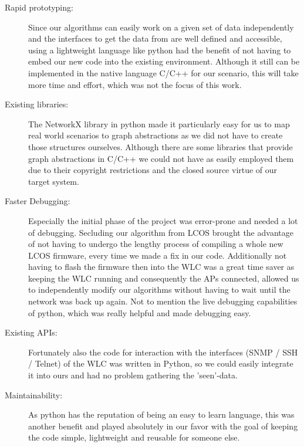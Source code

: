     \begin{description}
      \item [Rapid prototyping:]
	Since our algorithms can easily work on a given set of data independently and the interfaces to get the data from are well defined and accessible,
	using a lightweight language like python had the benefit of not having to embed our new code into the existing environment. 
	Although it still can be implemented in the native language C/C++ for our scenario, this will take more time and effort, which was not the focus of this work.
      \item[Existing libraries:]
	The NetworkX library in python made it particularly easy for us to map real world scenarios to graph abstractions as we did not have to create those structures ourselves.
	Although there are some libraries that provide graph abstractions in C/C++ we could not have as easily employed them due to their copyright restrictions and 
	the closed source virtue of our target system.
      \item[Faster Debugging:]
	Especially the initial phase of the project was error-prone and needed a lot of debugging. Secluding our algorithm from \ac{LCOS}
	brought the advantage of not having to undergo the lengthy process of compiling a whole new LCOS firmware, every time we made a fix in our code.
	Additionally not having to flash the firmware then into the \ac{WLC} was a great time saver as keeping the \ac{WLC} running and 
	consequently the APs connected, allowed us to independently modify our algorithms without having to wait until the network was back up again. 
	Not to mention the live debugging capabilities of python, which was really helpful and made debugging easy.
      \item[Existing APIs:]
	Fortunately also the code for interaction with the interfaces (\ac{SNMP} / \ac{SSH} / Telnet) of the \ac{WLC} was written in Python, so we could easily 
	integrate it into ours and had no problem gathering the 'seen'-data.
      \item[Maintainability:]
	As python has the reputation of being an easy to learn language, this was another benefit and played absolutely in our favor with the goal of
	keeping the code simple, lightweight and reusable for someone else.
    \end{description}
    
    \newpage
    
